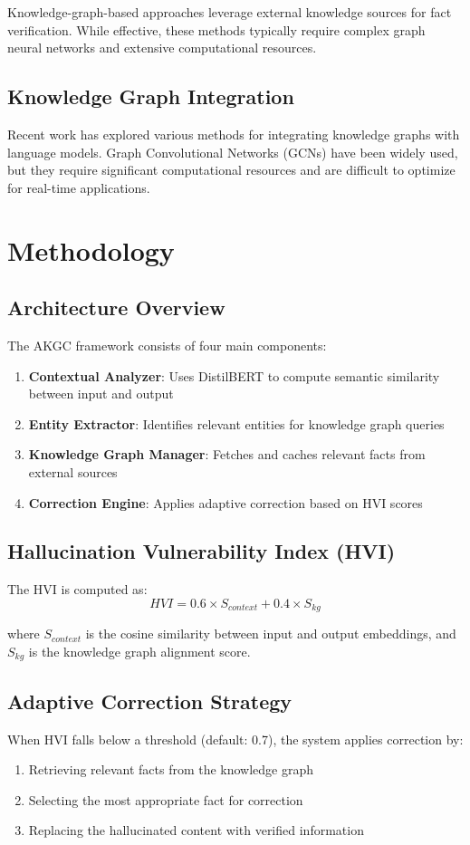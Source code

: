 \documentclass[conference]{IEEEtran}
\begin{document}
Knowledge-graph-based approaches \cite{kang2024correcting} leverage external knowledge sources for fact verification. While effective, these methods typically require complex graph neural networks and extensive computational resources.

\subsection{Knowledge Graph Integration}
Recent work has explored various methods for integrating knowledge graphs with language models. Graph Convolutional Networks (GCNs) \cite{kipf2016semi} have been widely used, but they require significant computational resources and are difficult to optimize for real-time applications.

\section{Methodology}
\subsection{Architecture Overview}
The AKGC framework consists of four main components:

\begin{enumerate}
\item \textbf{Contextual Analyzer}: Uses DistilBERT to compute semantic similarity between input and output
\item \textbf{Entity Extractor}: Identifies relevant entities for knowledge graph queries
\item \textbf{Knowledge Graph Manager}: Fetches and caches relevant facts from external sources
\item \textbf{Correction Engine}: Applies adaptive correction based on HVI scores
\end{enumerate}

\subsection{Hallucination Vulnerability Index (HVI)}
The HVI is computed as:
\begin{equation}
HVI = 0.6 \times S_{context} + 0.4 \times S_{kg}
\end{equation}

where $S_{context}$ is the cosine similarity between input and output embeddings, and $S_{kg}$ is the knowledge graph alignment score.

\subsection{Adaptive Correction Strategy}
When HVI falls below a threshold (default: 0.7), the system applies correction by:
\begin{enumerate}
\item Retrieving relevant facts from the knowledge graph
\item Selecting the most appropriate fact for correction
\item Replacing the hallucinated content with verified information
\end{enumerate}
\end{document}
